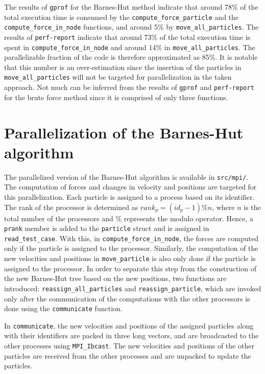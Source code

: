 \documentclass[10pt,journal,compsocconf]{IEEEtran}
\newcommand{\code}[1]{{\small \texttt{#1}}}
\begin{document}
The results of \code{gprof} for the Barnes-Hut method indicate that around 78\% of the total execution time is consumed by the \code{compute\_force\_particle} and the \code{compute\_force\_in\_node} functions, and around 5\% by \code{move\_all\_particles}. The results of \code{perf-report} indicate that around 73\% of the total execution time is spent in \code{compute\_force\_in\_node} and around 14\% in \code{move\_all\_particles}. The parallelizable fraction of the code is therefore approximated as 85\%. It is notable that this number is an over-estimation since the insertion of the particles in \code{move\_all\_particles} will not be targeted for parallelization in the taken approach. Not much can be inferred from the results of \code{gprof} and \code{perf-report} for the brute force method since it is comprised of only three functions.

\section{Parallelization of the Barnes-Hut algorithm}

The parallelized version of the Barnes-Hut algorithm is available in \code{src/mpi/}. The computation of forces and changes in velocity and positions are targeted for this parallelization. Each particle is assigned to a process based on its identifier. The rank of the processor is determined as ${rank}_p = ({id}_p - 1) \% n$, where $n$ is the total number of the processors and $\%$ represents the modulo operator. Hence, a \code{prank} member is added to the \code{particle} struct and is assigned in \code{read\_test\_case}. With this, in \code{compute\_force\_in\_node}, the forces are computed only if the particle is assigned to the processor. Similarly, the computation of the new velocities and positions in \code{move\_particle} is also only done if the particle is assigned to the processor. In order to separate this step from the construction of the new Barnes-Hut tree based on the new positions, two functions are introduced: \code{reassign\_all\_particles} and \code{reassign\_particle}, which are invoked only after the communication of the computations with the other processors is done using the \code{communicate} function.

In \code{communicate}, the new velocities and positions of the assigned particles along with their identifiers are packed in three long vectors, and are broadcasted to the other processes using \code{MPI\_Ibcast}. The new velocities and positions of the other particles are received from the other processes and are unpacked to update the particles.
\end{document}
